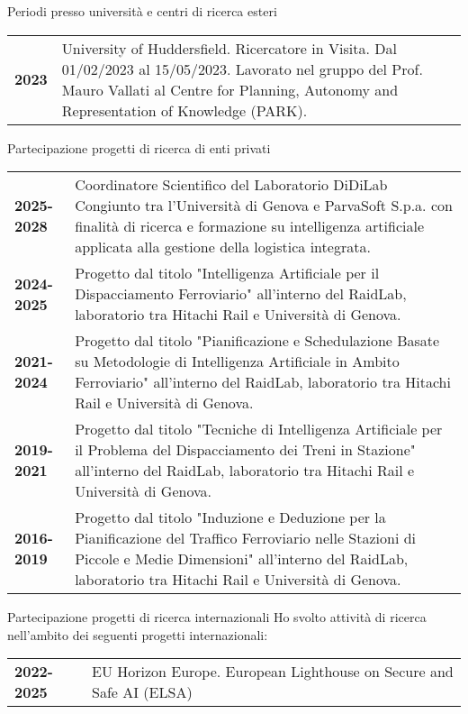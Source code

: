 \documentclass{resume} %
\begin{document}
\begin{rSection}{Periodi presso università e centri di ricerca esteri}
	\begin{tabularx}{0.95\textwidth} {lp{14cm}}
 \textbf{2023} & University of Huddersfield. Ricercatore in Visita. Dal 01/02/2023 al 15/05/2023. Lavorato nel gruppo del Prof. Mauro Vallati al Centre for Planning, Autonomy and Representation of Knowledge (PARK).
 \end{tabularx}
\end{rSection}

\begin{rSection}{Partecipazione progetti di ricerca di enti privati}
	\begin{tabularx}{0.95\textwidth} {lp{14cm}}
 	\textbf{2025-2028} & Coordinatore Scientifico del Laboratorio DiDiLab Congiunto tra l'Università di Genova e ParvaSoft S.p.a. con finalità di ricerca e formazione su intelligenza artificiale applicata alla gestione della logistica integrata. \\
 	\textbf{2024-2025} & Progetto dal titolo "Intelligenza Artificiale per il Dispacciamento Ferroviario" all'interno del RaidLab, laboratorio tra Hitachi Rail e Università di Genova. \\
  	\textbf{2021-2024} & Progetto dal titolo "Pianificazione e Schedulazione Basate su Metodologie di Intelligenza Artificiale in Ambito Ferroviario" all'interno del RaidLab, laboratorio tra Hitachi Rail e Università di Genova. \\
   	\textbf{2019-2021} & Progetto dal titolo "Tecniche di Intelligenza Artificiale per il Problema del Dispacciamento dei Treni in Stazione" all'interno del RaidLab, laboratorio tra Hitachi Rail e Università di Genova.\\
    \textbf{2016-2019} & Progetto dal titolo "Induzione e Deduzione per la Pianificazione del Traffico Ferroviario nelle Stazioni di Piccole e Medie Dimensioni" all'interno del RaidLab, laboratorio tra Hitachi Rail e Università di Genova.\\
 \end{tabularx}
\end{rSection}

\begin{rSection}{Partecipazione progetti di ricerca internazionali}
Ho svolto attività di ricerca nell'ambito dei seguenti progetti internazionali:\\
	\begin{tabularx}{0.95\textwidth} {lp{14cm}}
 \textbf{2022-2025} & EU Horizon Europe. European Lighthouse on Secure and Safe AI (ELSA)
 \end{tabularx}
\end{rSection}
\end{document}
